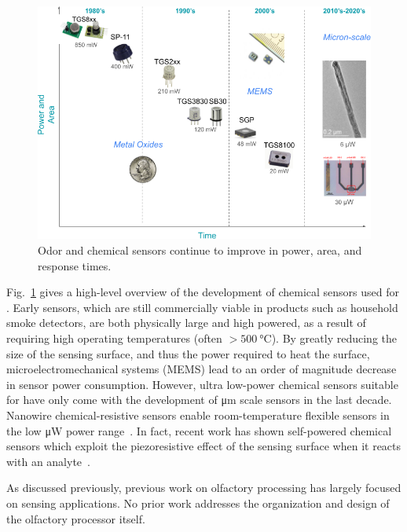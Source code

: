 \begin{figure}[h]
    \centering
    \includegraphics[width=0.7\linewidth]{sensor_timelines.png}
    \caption{\small
        Odor and chemical sensors continue to improve in power, area, and response
        times.
    }
    \label{fig:sensor_timelines}
\end{figure}


Fig.~\ref{fig:sensor_timelines} gives a high-level overview of the
development of chemical sensors used for \olfc{}.  Early sensors, which are
still commercially viable in products such as household smoke detectors, are
both physically large and high powered, as a result of requiring high operating
temperatures (often \(>\SI{500}{\celsius}\)). By greatly reducing the size of
the sensing surface, and thus the power required to heat the surface,
microelectromechanical systems (MEMS) lead to an order of magnitude decrease in
sensor power consumption. However, ultra low-power chemical sensors suitable for
\olfc{} have only come with the development of \si{\micro\meter} scale sensors
in the last decade. Nanowire chemical-resistive sensors enable room-temperature
flexible sensors in the low \si{\micro\watt} power
range~\cite{majhi2021recent}. In fact, recent work has shown self-powered
chemical sensors which exploit the piezoresistive effect of the sensing surface
when it reacts with an analyte~\cite{setiono2019real}. 

As discussed previously, previous work on olfactory processing has largely focused on sensing applications. No prior work addresses
the organization and design of the olfactory processor itself.



